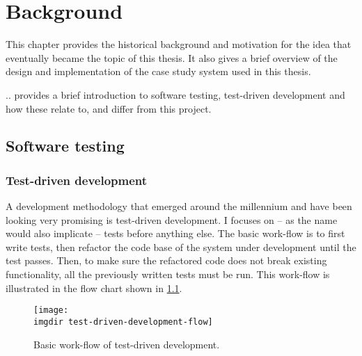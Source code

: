 

\chapter{Background}
This chapter provides the historical background and motivation for the idea that eventually became the topic of this thesis. It also gives a brief overview of the design and implementation of the case study system used in this thesis.

.. provides a brief introduction to software testing, test-driven development and how these relate to, and differ from this project.

\section{Software testing}

\subsection{Test-driven development}
A development methodology that emerged around the millennium and have been looking very promising is test-driven development. I focuses on -- as the name would also implicate -- tests before anything else. The basic work-flow is to first write tests, then refactor the code base of the system under development until the test passes. Then, to make sure the refactored code does not break existing functionality, all the previously written tests must be run. This work-flow is illustrated in the flow chart shown in \ref{fig:test-driven-development-flow}.

\begin{figure}[!htbp]
\centering
\texttt{[image: \\imgdir test-driven-development-flow]}
\caption{Basic work-flow of test-driven development.}
\label{fig:test-driven-development-flow}
\end{figure}

